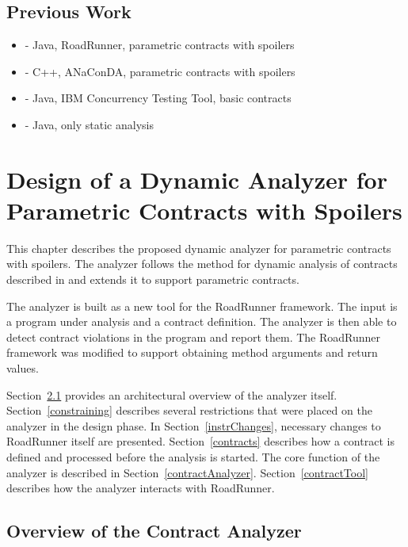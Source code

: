 \section{Previous Work}


\begin{itemize}
    \item \cite{janousek} - Java, RoadRunner, parametric contracts with spoilers
    \item \cite{contracts} - C++, ANaConDA, parametric contracts with spoilers
    \item \cite{FITPUB10817} - Java, IBM Concurrency Testing Tool, basic
        contracts
    \item \cite{DBLP:journals/corr/SousaDFL15} - Java, only static analysis
\end{itemize}



\chapter{Design of a Dynamic Analyzer for Parametric Contracts with Spoilers}
\label{chFour}

This chapter describes the proposed dynamic analyzer for parametric contracts
with spoilers. The analyzer follows the method for dynamic analysis of contracts
described in \cite{contracts} and extends it to support parametric contracts.

The analyzer is built as a new tool for the RoadRunner framework. The input is a
program under analysis and a contract definition. The analyzer is then able to
detect contract violations in the program and report them. The RoadRunner
framework was modified to support obtaining method arguments and return values.

Section~\ref{overview} provides an architectural overview of the analyzer
itself. Section~\ref{constraining} describes several restrictions that were
placed on the analyzer in the design phase. In Section~\ref{instrChanges},
necessary changes to RoadRunner itself are presented. Section~\ref{contracts}
describes how a contract is defined and processed before the analysis is
started. The core function of the analyzer is described in
Section~\ref{contractAnalyzer}. Section~\ref{contractTool} describes how the
analyzer interacts with RoadRunner.

\section{Overview of the Contract Analyzer}
\label{overview}

